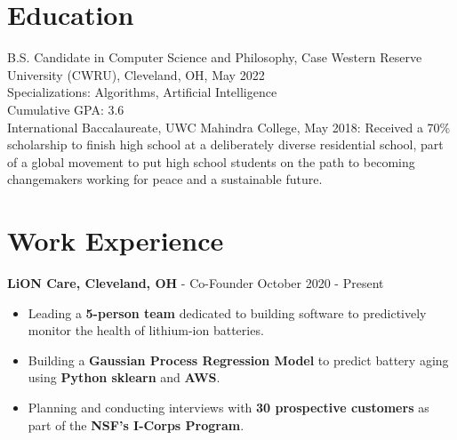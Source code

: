 \documentclass{res}
\begin{document}
 
 
 
\address{ 216- 713 6931 \\  rounak@case.edu}
\address{\hfill github.com/theroshogolla \\ \hfill linkedin.com/in/rounakchawla/}
 
\begin{resume} 
 
\section{Education} 
B.S. Candidate in Computer Science and Philosophy, Case Western Reserve University (CWRU), Cleveland, OH, May 2022 \\
Specializations: Algorithms, Artificial Intelligence \\
Cumulative GPA: 3.6 \\ 
International Baccalaureate, UWC Mahindra College, May 2018: Received a 70\% scholarship to finish high school at a deliberately diverse residential school, part of a global movement to put high school students on the path to becoming changemakers working for peace and a sustainable future.

\section{Work Experience}
{\bf LiON Care, Cleveland, OH} - Co-Founder \hfill October 2020 - Present
\begin{itemize} \itemsep -2pt
	\item Leading a \textbf{5-person team} dedicated to building software to predictively monitor the health of lithium-ion batteries.
	\item Building a \textbf{Gaussian Process Regression Model} to predict battery aging using \textbf{Python sklearn} and \textbf{AWS}.
	\item Planning and conducting interviews with \textbf{30 prospective customers} as part of the \textbf{NSF's I-Corps Program}.
	

\end{itemize}
\end{resume}
\end{document}
